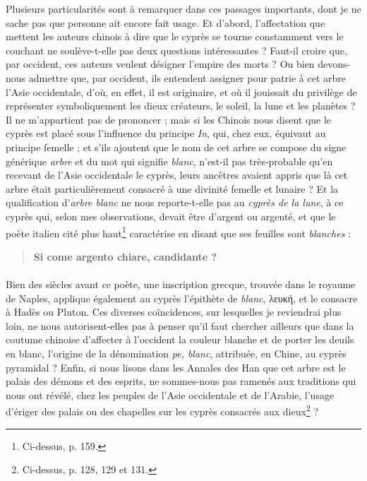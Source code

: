 \documentclass{article}
\begin{document}
Plusieurs particularités sont à remarquer dans ces passages importants, dont je ne sache pas que personne ait encore fait usage. Et d'abord, l'affectation que mettent les auteurs chinois à dire que le cyprès se tourne constamment vers le couchant ne soulève-t-elle pas deux questions intéressantes ? Faut-il croire que, par occident, ces auteurs veulent désigner l'empire des morts ? Ou bien devons-nous admettre que, par occident, ils entendent assigner pour patrie à cet arbre l'Asie occidentale, d'où, en effet, il est originaire, et où il jouissait du privilège de représenter symboliquement les dieux créateurs, le soleil, la lune et les planètes ? Il ne m'appartient pas de prononcer ; mais si les Chinois nous disent que le cyprès est placé sous l'influence du principe \emph{In}, qui, chez eux, équivaut au principe femelle ; et s'ils ajoutent que le nom de cet arbre se compose du signe générique \emph{arbre} et du mot qui signifie \emph{blanc}, n'est-il pas très-probable qu'en recevant de l'Asie occidentale le cyprès, leurs ancêtres avaient appris que là cet arbre était particulièrement consacré à une divinité femelle et lunaire ? Et la qualification d'\emph{arbre blanc} ne nous reporte-t-elle pas au \emph{cyprès de la lune}, à ce cyprès qui, selon mes observations, devait être d'argent ou argenté, et que le poète italien cité plus haut\footnote{Ci-dessus, p. 159.} caractérise en disant que ses feuilles sont \emph{blanches} :

\begin{quotation}\scriptsize\bfseries
Si come argento chiare, candidante ?
\end{quotation}

\paragraph{}
Bien des siècles avant ce poète, une inscription grecque, trouvée dans le royaume de Naples, applique également au cyprès l'épithète de \emph{blanc}, \textgreek{λευκή}, et le consacre à Hadès ou Pluton. Ces diverses coïncidences, sur lesquelles je reviendrai plus loin, ne nous autorisent-elles pas à penser qu'il faut chercher ailleurs que dans la coutume chinoise d'affecter à l'occident la couleur blanche et de porter les deuils en blanc, l'origine de la dénomination \emph{pe, blanc}, attribuée, en Chine, au cyprès pyramidal ? Enfin, si nous lisons dans les Annales des Han que cet arbre est le palais des démons et des esprits, ne sommes-nous pas ramenés aux traditions qui nous ont révélé, chez les peuples de l'Asie occidentale et de l'Arabie, l'usage d'ériger des palais ou des chapelles sur les cyprès consacrés aux dieux\footnote{Ci-dessus, p. 128, 129 et 131.} ?
\end{document}

